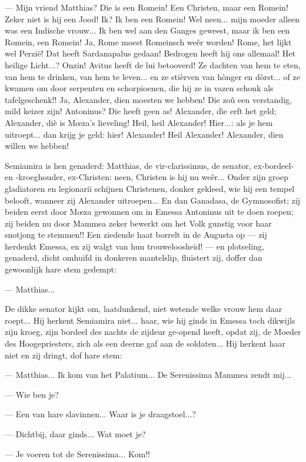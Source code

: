\documentclass[a4paper, 12pt, oneside, dutch]{article}
\begin{document}
--- Mijn vriend Matthias? Die is een Romein! Een Christen, maar een Romein! Zeker niet is hij een Jood! Ik? Ik ben een Romein! Wel neen... mijn moeder alleen was een Indische vrouw... Ik ben wel aan den Ganges geweest, maar ik ben een Romein, een Romein! Ja, Rome moest Romeinsch weêr worden! Rome, het lijkt wel Perzië! Dat heeft Sardanapalus gedaan! Bedrogen heeft hij ons allemaal! Het heilige Licht...? Onzin! Avitus heeft de lui betooverd! Ze dachten van hem te eten, van hem te drinken, van hem te leven... en ze stièrven van hònger en dòrst... of ze kwamen om door serpenten en schorpioenen, die hij ze in vazen schonk als tafelgeschenk!! Ja, Alexander, dien moesten we hebben! Die zoû een verstandig, mild keizer zijn! Antoninus? Die heeft geen as! Alexander, dìe erft het geld; Alexander, diè is Mœza's lieveling! Heil, heil Alexander! Hier...: als je hem uitroept... dan krijg je geld: hier! Alexander! Heil Alexander! Alexander, dien willen we hebben!

Semiamira is hen genaderd: Matthias, de vir-clarissimus, de senator, ex-bordeel- en -kroeghouder, ex-Christen: neen, Christen is hij nu weêr... Onder zijn groep gladiatoren en legionariï schijnen Christenen, donker gekleed, wie hij een tempel belooft, wanneer zij Alexander uitroepen... En dan Ganadasa, de Gymnosofist; zij beiden eerst door Mœza gewonnen om in Emessa Antoninus uit te doen roepen; zij beiden nu door Mammea zeker bewerkt om het Volk gunstig voor haar snotjong te stemmen!! Een ziedende haat borrelt in de Augusta op --- zij herdenkt Emessa, en zij walgt van hun trouweloosheid! --- en plotseling, genaderd, dicht omhuifd in donkeren mantelslip, fluistert zij, doffer dan gewoonlijk hare stem gedempt:

--- Matthias...

De dikke senator kijkt om, laatdunkend, niet wetende welke vrouw hem daar roept... Hij herkent Semiamira niet... haar, wie hij ginds in Emessa toch dikwijls zijn kroeg, zijn bordeel des nachts de zijdeur ge-opend heeft, opdat zij, de Moeder des Hoogepriesters, zich als een deerne gaf aan de soldaten... Hij herkent haar niet en zij dringt, dof hare stem:

--- Matthias... Ik kom van het Palatium... De Serenissima Mammea zendt mij...

--- Wie ben je?

--- Een van hare slavinnen... Waar is je draagstoel...?

--- Dichtbij, daar ginds... Wat moet je?

--- Je voeren tot de Serenissima... Kom!!
\end{document}
